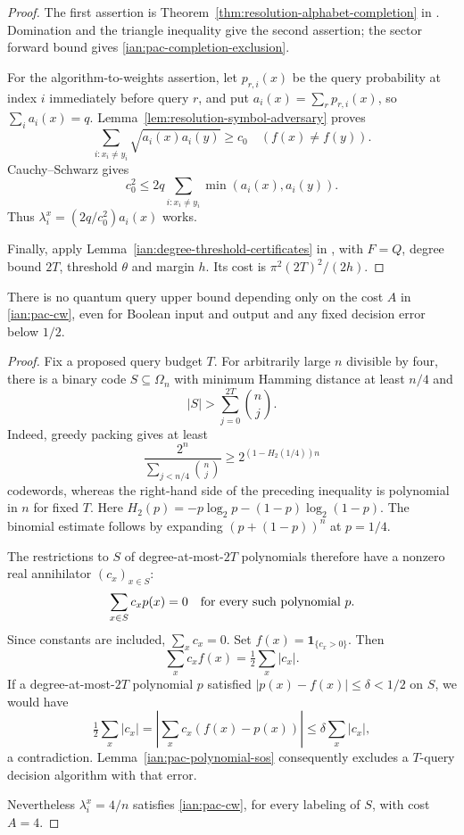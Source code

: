 \begin{proof}
The first assertion is
Theorem~\ref{thm:resolution-alphabet-completion} in
.
Domination and the triangle inequality give the second assertion;
the sector forward bound gives
\eqref{ian:pac-completion-exclusion}.

For the algorithm-to-weights assertion, let \(p_{r,i}(x)\) be the
query probability at index \(i\) immediately before query \(r\), and put
\(a_i(x)=\sum_r p_{r,i}(x)\), so \(\sum_i a_i(x)=q\).
Lemma~\ref{lem:resolution-symbol-adversary} proves
\[
 \sum_{i:x_i\ne y_i}\sqrt{a_i(x)a_i(y)}\ge c_0
 \quad(f(x)\ne f(y)).
\]
Cauchy--Schwarz gives
\[
 c_0^2
 \le2q\sum_{i:x_i\ne y_i}\min(a_i(x),a_i(y)).
\]
Thus \(\lambda_i^x=(2q/c_0^2)a_i(x)\) works.

Finally, apply Lemma~\ref{ian:degree-threshold-certificates} in
, with \(F=Q\),
degree bound \(2T\), threshold \(\theta\) and margin \(h\).
Its cost is \(\pi^2(2T)^2/(2h)\).
\end{proof}

\begin{proposition}
\label{ian:pac-completion-not-synthesis}
There is no quantum query upper bound depending only on the cost
\(A\) in \eqref{ian:pac-cw}, even for Boolean input and output and
any fixed decision error below \(1/2\).
\end{proposition}

\begin{proof}
Fix a proposed query budget \(T\).
For arbitrarily large \(n\) divisible by four, there is a binary
code \(S\subseteq\Omega_n\) with minimum Hamming distance at least
\(n/4\) and
\[
 |S|>\sum_{j=0}^{2T}\binom nj.
\]
Indeed, greedy packing gives at least
\[
 \frac{2^n}{\sum_{j<n/4}\binom nj}
 \ge 2^{(1-H_2(1/4))n}
\]
codewords, whereas the right-hand side of the preceding inequality
is polynomial in \(n\) for fixed \(T\).
Here \(H_2(p)=-p\log_2p-(1-p)\log_2(1-p)\).
The binomial estimate follows by expanding
\((p+(1-p))^n\) at \(p=1/4\).

The restrictions to \(S\) of degree-at-most-\(2T\) polynomials
therefore have a nonzero real annihilator
\((c_x)_{x\in S}\):
\[
 \sum_{x\in S}c_xp(x)=0
 \quad\hbox{for every such polynomial }p.
\]
Since constants are included, \(\sum_xc_x=0\).
Set \(f(x)=\mathbf1_{\{c_x>0\}}\). Then
\[
 \sum_xc_xf(x)=\tfrac12\sum_x|c_x|.
\]
If a degree-at-most-\(2T\) polynomial \(p\) satisfied
\(|p(x)-f(x)|\le\delta<1/2\) on \(S\), we would have
\[
 \tfrac12\sum_x|c_x|
   =\left|\sum_xc_x(f(x)-p(x))\right|
   \le\delta\sum_x|c_x|,
\]
a contradiction. Lemma~\ref{ian:pac-polynomial-sos} consequently
excludes a \(T\)-query decision algorithm with that error.

Nevertheless \(\lambda_i^x=4/n\) satisfies
\eqref{ian:pac-cw}, for every labeling of \(S\), with cost \(A=4\).
\end{proof}

